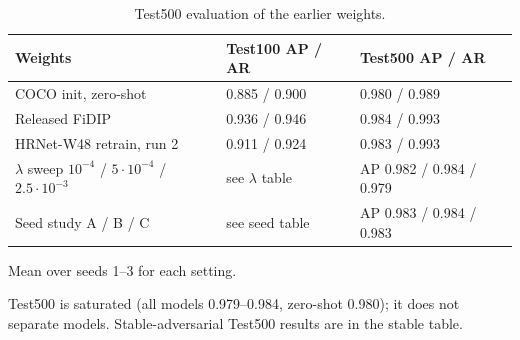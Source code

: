 \documentclass[10pt]{article}
\begin{document}
\begin{table}[h]\centering\small
\begin{threeparttable}
\caption{Test500 evaluation of the earlier weights.}
\begin{tabularx}{\linewidth}{X l l}
\toprule
Weights & Test100 AP / AR & Test500 AP / AR \\
\midrule
COCO init, zero-shot & 0.885 / 0.900 & 0.980 / 0.989 \\
Released FiDIP & 0.936 / 0.946 & 0.984 / 0.993 \\
HRNet-W48 retrain, run 2 & 0.911 / 0.924 & 0.983 / 0.993 \\
$\lambda$ sweep $10^{-4}$ / $5\cdot10^{-4}$ / $2.5\cdot10^{-3}$ & see $\lambda$ table & AP 0.982 / 0.984 / 0.979 \\
Seed study A / B / C\tnote{a} & see seed table & AP 0.983 / 0.984 / 0.983 \\
\bottomrule
\end{tabularx}
\begin{tablenotes}\footnotesize
\item[a] Mean over seeds 1--3 for each setting.
\item Test500 is saturated (all models 0.979--0.984, zero-shot 0.980); it does not separate models. Stable-adversarial Test500 results are in the stable table.
\end{tablenotes}
\end{threeparttable}
\end{table}
\end{document}

